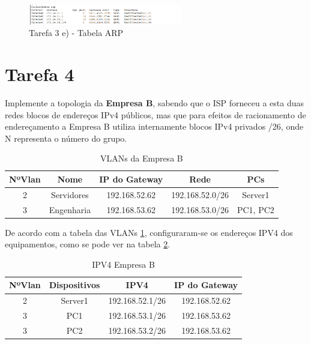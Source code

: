 \documentclass[11pt,english, openright, oneside]{book}
\begin{document}
\begin{figure}[H]
    \centering
    \includegraphics[width=0.6\textwidth]{imagens/Tarefa3/3.e.2.png}
    \caption{Tarefa 3 e) - Tabela ARP}
    \label{fig:3.e.2}
\end{figure}
\vspace{0.8cm}

\pagebreak

\section{Tarefa 4}
\vspace{0.2cm}

Implemente a topologia da \textbf{Empresa B}, sabendo que o ISP forneceu a esta
duas redes blocos de endereços IPv4 públicos, mas que para efeitos de
racionamento de endereçamento a Empresa B utiliza internamente blocos IPv4
privados /26, onde N representa o número do grupo.  
\vspace{0.8cm}

\begin{table}[h!]
    \centering
    \begin{tabular}{|c|c|c|c|c|}
    \hline
         \textbf{NºVlan} & \textbf{Nome} & \textbf{IP do Gateway} &
         \textbf{Rede} & \textbf{PCs}\\
    \hline
        2 & Servidores & 192.168.52.62 & 192.168.52.0/26 & Server1\\
        3 & Engenharia & 192.168.53.62 & 192.168.53.0/26 & PC1, PC2\\
    \hline
    \end{tabular}
    \caption{VLANs da Empresa B}
    \label{tab:vlansB}
\end{table}
\vspace{0.2cm}

De acordo com a tabela das VLANs \ref{tab:vlansB}, configuraram-se os endereços
IPV4 dos equipamentos, como se pode ver na tabela \ref{tab:ipB}.
\vspace{0.2cm}

\begin{table}[h!]
    \centering
    \begin{tabular}{|c|c|c|c|}
    \hline
        \textbf{NºVlan} & \textbf{Dispositivos} & \textbf{IPV4} & \textbf{IP do
        Gateway}\\
    \hline
        2 & Server1 & 192.168.52.1/26 & 192.168.52.62\\
        3 & PC1 & 192.168.53.1/26 & 192.168.53.62\\
        3 & PC2 & 192.168.53.2/26 & 192.168.53.62\\
    \hline
    \end{tabular}
    \caption{IPV4 Empresa B}
    \label{tab:ipB}
\end{table}
\vspace{0.2cm}
\end{document}
